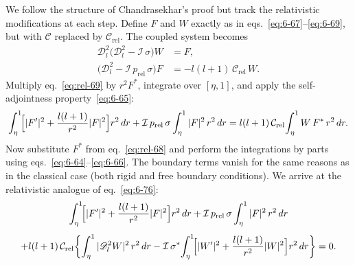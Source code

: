 We follow the structure of Chandrasekhar's proof but track the
relativistic modifications at each step.  Define $F$ and $W$ exactly as
in eqs.~\eqref{eq:6-67}--\eqref{eq:6-69}, but with $\mathcal{C}$
replaced by $\mathcal{C}_{\mathrm{rel}}$.  The coupled system becomes
\begin{align}
  \mathscr{D}_{l}^{2}\!
    \bigl(\mathscr{D}_{l}^{2} - \mathcal{I}\,\sigma\bigr) W
    &= F,
  \label{eq:rel-68} \\[4pt]
  \bigl(\mathscr{D}_{l}^{2}
    - \mathcal{I}\,p_{\mathrm{rel}}\,\sigma\bigr) F
    &= -l(l+1)\,\mathcal{C}_{\mathrm{rel}}\,W.
  \label{eq:rel-69}
\end{align}
Multiply eq.~\eqref{eq:rel-69} by $r^{2}F^{*}$, integrate over
$[\eta,1]$, and apply the self-adjointness property~\eqref{eq:6-65}:
\begin{equation}
  \int_{\eta}^{1}\!\Bigl[|F'|^{2}
    + \frac{l(l+1)}{r^{2}}|F|^{2}\Bigr]r^{2}\,dr
  + \mathcal{I}\,p_{\mathrm{rel}}\,\sigma
    \int_{\eta}^{1}|F|^{2}\,r^{2}\,dr
  = l(l+1)\,\mathcal{C}_{\mathrm{rel}}\!
    \int_{\eta}^{1}W\,F^{*}\,r^{2}\,dr.
  \label{eq:rel-71}
\end{equation}
Now substitute $F^{*}$ from eq.~\eqref{eq:rel-68} and perform the
integrations by parts using eqs.~\eqref{eq:6-64}--\eqref{eq:6-66}.
The boundary terms vanish for the same reasons as in the classical case
(both rigid and free boundary conditions).  We arrive at the
relativistic analogue of eq.~\eqref{eq:6-76}:
\begin{multline}
  \int_{\eta}^{1}\!\Bigl[|F'|^{2}
    + \frac{l(l+1)}{r^{2}}|F|^{2}\Bigr]r^{2}\,dr
  + \mathcal{I}\,p_{\mathrm{rel}}\,\sigma
    \int_{\eta}^{1}|F|^{2}\,r^{2}\,dr \\[4pt]
  + l(l+1)\,\mathcal{C}_{\mathrm{rel}}\!
    \left\{\int_{\eta}^{1}|\mathscr{D}_{l}^{2}W|^{2}\,r^{2}\,dr
    - \mathcal{I}\,\sigma^{*}\!
      \int_{\eta}^{1}\!\Bigl[|W'|^{2}
        + \frac{l(l+1)}{r^{2}}|W|^{2}\Bigr]
      r^{2}\,dr\right\} = 0.
  \label{eq:rel-76}
\end{multline}

